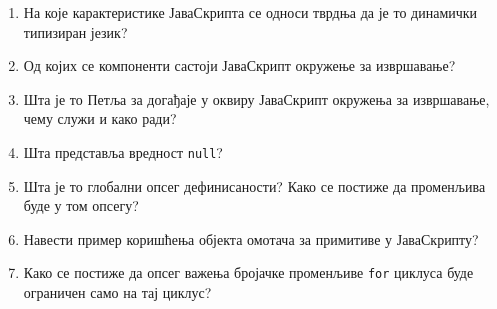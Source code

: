 \documentclass[a4paper]{article}
\begin{document}
\begin{enumerate}
\item На које карактеристике ЈаваСкрипта се односи тврдња да је то динамички типизиран језик? \hrulefill

\hrulefill

\hrulefill

\hrulefill

\hrulefill


\item Од којих се компоненти састоји ЈаваСкрипт окружење за извршавање? \hrulefill

\hrulefill

\hrulefill

\hrulefill

\hrulefill


\item Шта је то Петља за догађаје у оквиру ЈаваСкрипт окружења за извршавање, чему служи и како ради? \hrulefill

\hrulefill

\hrulefill 

\hrulefill

\hrulefill


\item Шта представља вредност \verb|null|? \hrulefill

\hrulefill

\hrulefill 

\hrulefill

\hrulefill



\item Шта је то глобални опсег дефинисаности? Како се постиже да променљива буде у том опсегу? \hrulefill

\hrulefill 

\hrulefill 

\hrulefill

\hrulefill


\item Навести пример коришћења објекта омотача за примитиве у ЈаваСкрипту? \hrulefill

\hrulefill 

\hrulefill 

\hrulefill

\hrulefill


\item Како се постиже да опсег важења бројачке променљиве \verb|for| циклуса буде ограничен само на тај циклус? \hrulefill

\hrulefill


\end{enumerate}
\end{document}
